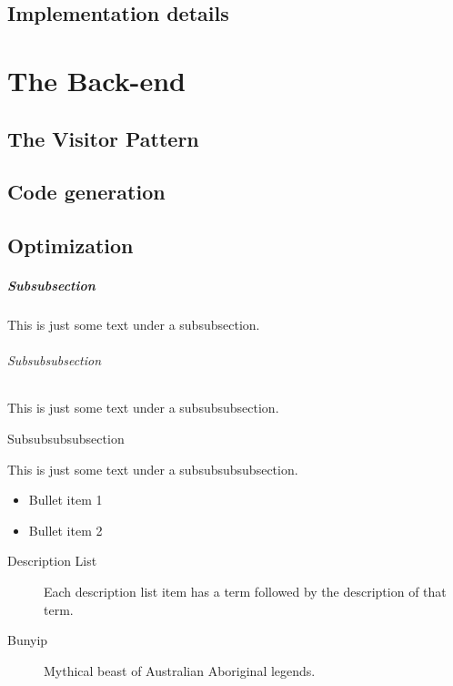 \documentclass[letterpaper,12pt,openany,reqno]{book}%
\begin{document}
\chapter {Implementation details}

\part{The Back-end}
\chapter {The Visitor Pattern}
\chapter {Code generation}
\chapter {Optimization}

\subsubsection{Subsubsection}

This is just some text under a subsubsection.

\paragraph{Subsubsubsection}

This is just some  text under a subsubsubsection.

\subparagraph{Subsubsubsubsection}

This is just some text under a subsubsubsubsection.


\begin{itemize}
\item Bullet item 1

\item Bullet item 2

\end{itemize}

\begin{description}
\item[Description List] Each description list item has a term followed by the
description of that term.

\item[Bunyip] Mythical beast of Australian Aboriginal legends.
\end{description}
\end{document}
